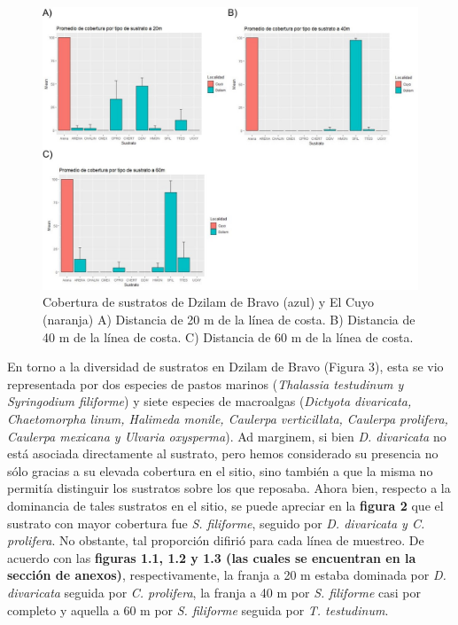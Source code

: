 \documentclass[
  authoryear,
  preprint,
  3p,
  twocolumn]{elsarticle}
\begin{document}
\begin{figure}

{\centering \includegraphics{Promedio_sustratos.JPG}

}

\caption{Cobertura de sustratos de Dzilam de Bravo (azul) y El Cuyo
(naranja) A) Distancia de 20 m de la línea de costa. B) Distancia de 40
m de la línea de costa. C) Distancia de 60 m de la línea de costa.}

\end{figure}

En torno a la diversidad de sustratos en Dzilam de Bravo (Figura 3),
esta se vio representada por dos especies de pastos marinos
(\emph{Thalassia testudinum y Syringodium filiforme}) y siete especies
de macroalgas (\emph{Dictyota divaricata, Chaetomorpha linum, Halimeda
monile, Caulerpa verticillata, Caulerpa prolifera, Caulerpa mexicana y
Ulvaria oxysperma}). Ad marginem, si bien \emph{D. divaricata} no está
asociada directamente al sustrato, pero hemos considerado su presencia
no sólo gracias a su elevada cobertura en el sitio, sino también a que
la misma no permitía distinguir los sustratos sobre los que reposaba.
Ahora bien, respecto a la dominancia de tales sustratos en el sitio, se
puede apreciar en la \textbf{figura 2} que el sustrato con mayor
cobertura fue \emph{S. filiforme}, seguido por \emph{D. divaricata y C.
prolifera}. No obstante, tal proporción difirió para cada línea de
muestreo. De acuerdo con las \textbf{figuras 1.1, 1.2 y 1.3 (las cuales
se encuentran en la sección de anexos)}, respectivamente, la franja a 20
m estaba dominada por \emph{D. divaricata} seguida por \emph{C.
prolifera}, la franja a 40 m por \emph{S. filiforme} casi por completo y
aquella a 60 m por \emph{S. filiforme} seguida por \emph{T. testudinum}.
\end{document}

